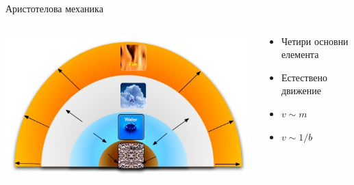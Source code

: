 \documentclass[10pt,a4paper]{beamer}
\begin{document}
        \begin{frame}{ Аристотелова механика }
			\begin{columns}
				\begin{column}{0.6\textwidth}
					\includegraphics[width=\textwidth]{images/aristotle_four_elements_motion.jpg}
				\end{column}
				\begin{column}{0.4\textwidth}
					\begin{itemize}
						\item Четири основни елемента
                        \item Естествено движение
                        \item $ v \sim m $
                        \item $ v \sim 1/b $
					\end{itemize}
				\end{column}
			\end{columns}
        \end{frame}
		
\end{document}

